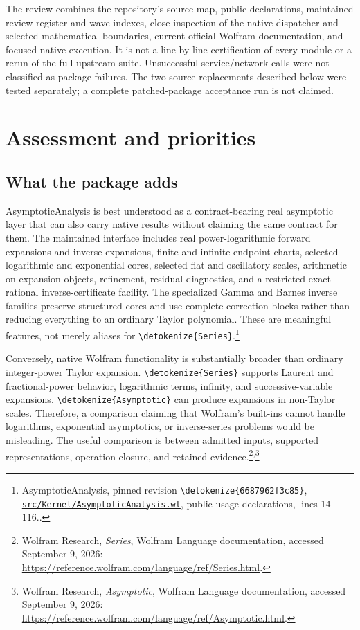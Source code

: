 \documentclass[11pt]{article}
\newcommand{\code}[1]{{\ttfamily\expandafter\nolinkurl\expandafter{\detokenize{#1}}}}
\newcommand{\repo}{https://github.com/VladimirReshetnikov/Asymptotic/blob/6687962f3c858a4f93623cfc496f33e35c6763d4/}
\newcommand{\src}[2]{\footnote{AsymptoticAnalysis, pinned revision \code{6687962f3c85}, \href{\repo#1}{\nolinkurl{#1}}, #2.}}
\newcommand{\wdoc}[1]{\footnote{Wolfram Research, \emph{#1}, Wolfram Language documentation, accessed September 9, 2026: \url{https://reference.wolfram.com/language/ref/#1.html}.}}
\begin{document}
The review combines the repository's source map, public declarations, maintained review register and wave indexes, close inspection of the native dispatcher and selected mathematical boundaries, current official Wolfram documentation, and focused native execution. It is not a line-by-line certification of every module or a rerun of the full upstream suite. Unsuccessful service/network calls were not classified as package failures. The two source replacements described below were tested separately; a complete patched-package acceptance run is not claimed.

\tableofcontents
\newpage

\section{Assessment and priorities}

\subsection{What the package adds}
AsymptoticAnalysis is best understood as a contract-bearing real asymptotic layer that can also carry native results without claiming the same contract for them. The maintained interface includes real power-logarithmic forward expansions and inverse expansions, finite and infinite endpoint charts, selected logarithmic and exponential cores, selected flat and oscillatory scales, arithmetic on expansion objects, refinement, residual diagnostics, and a restricted exact-rational inverse-certificate facility. The specialized Gamma and Barnes inverse families preserve structured cores and use complete correction blocks rather than reducing everything to an ordinary Taylor polynomial. These are meaningful features, not merely aliases for \code{Series}.\src{src/Kernel/AsymptoticAnalysis.wl}{public usage declarations, lines 14--116.}

Conversely, native Wolfram functionality is substantially broader than ordinary integer-power Taylor expansion. \code{Series} supports Laurent and fractional-power behavior, logarithmic terms, infinity, and successive-variable expansions. \code{Asymptotic} can produce expansions in non-Taylor scales. Therefore, a comparison claiming that Wolfram's built-ins cannot handle logarithms, exponential asymptotics, or inverse-series problems would be misleading. The useful comparison is between admitted inputs, supported representations, operation closure, and retained evidence.\wdoc{Series}\textsuperscript{,}\wdoc{Asymptotic}
\end{document}
